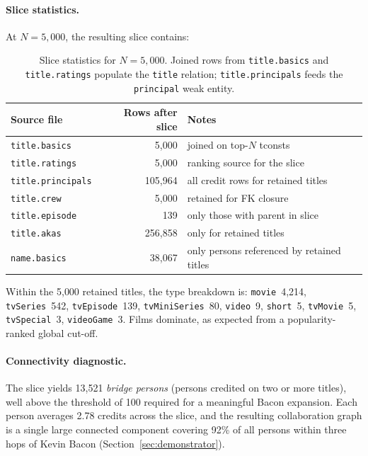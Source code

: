 \paragraph{Slice statistics.} At $N = 5{,}000$, the resulting slice contains:

\begin{table}[H]
\centering
\small
\begin{tabular}{lrl}
\hline
\textbf{Source file} & \textbf{Rows after slice} & \textbf{Notes} \\
\hline
\texttt{title.basics}     & 5{,}000   & joined on top-$N$ tconsts \\
\texttt{title.ratings}    & 5{,}000   & ranking source for the slice \\
\texttt{title.principals} & 105{,}964 & all credit rows for retained titles \\
\texttt{title.crew}       & 5{,}000   & retained for FK closure \\
\texttt{title.episode}    & 139       & only those with parent in slice \\
\texttt{title.akas}       & 256{,}858 & only for retained titles \\
\texttt{name.basics}      & 38{,}067  & only persons referenced by retained titles \\
\hline
\end{tabular}
\caption{Slice statistics for $N=5{,}000$. Joined rows from \texttt{title.basics} and \texttt{title.ratings} populate the \texttt{title} relation; \texttt{title.principals} feeds the \texttt{principal} weak entity.}
\label{tab:slice-stats}
\end{table}

Within the 5{,}000 retained titles, the type breakdown is: \texttt{movie}~4{,}214, \texttt{tvSeries}~542, \texttt{tvEpisode}~139, \texttt{tvMiniSeries}~80, \texttt{video}~9, \texttt{short}~5, \texttt{tvMovie}~5, \texttt{tvSpecial}~3, \texttt{videoGame}~3. Films dominate, as expected from a popularity-ranked global cut-off.

\paragraph{Connectivity diagnostic.} The slice yields 13{,}521 \emph{bridge persons} (persons credited on two or more titles), well above the threshold of 100 required for a meaningful Bacon expansion. Each person averages 2.78 credits across the slice, and the resulting collaboration graph is a single large connected component covering 92\% of all persons within three hops of Kevin Bacon (Section~\ref{sec:demonstrator}).

